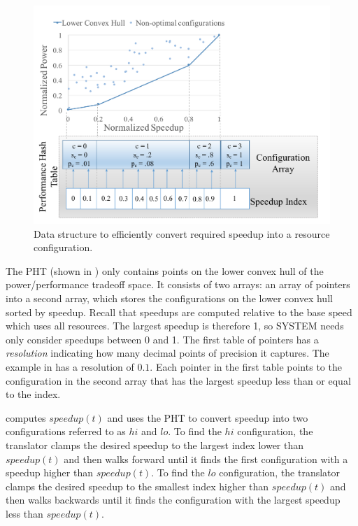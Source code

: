 \begin{figure}
\includegraphics[width=\columnwidth]{figures/performance-hash-table.pdf}
\caption{Data structure to efficiently convert required speedup into a
  resource configuration.}
  \label{fig:pht}
\end{figure}

The PHT (shown in ) only contains points on the lower
convex hull of the power/performance tradeoff space.  It consists of
two arrays: an array of pointers into a second array, which stores the
configurations on the lower convex hull sorted by speedup.  Recall
that speedups are computed relative to the base speed which uses all
resources.  The largest speedup is therefore 1, so SYSTEM{} needs only
consider speedups between 0 and 1.  The first table of pointers has a
\emph{resolution} indicating how many decimal points of precision it
captures.  The example in  has a resolution of $0.1$.
Each pointer in the first table points to the configuration in the
second array that has the largest speedup less than or equal to the
index.

\SYSTEM{} computes $speedup(t)$ and uses the PHT to convert speedup
into two configurations referred to as $hi$ and $lo$.  To find the
$hi$ configuration, the translator clamps the desired speedup to the
largest index lower than $speedup(t)$ and then walks forward until it
finds the first configuration with a speedup higher than $speedup(t)$.
To find the $lo$ configuration, the translator clamps the desired
speedup to the smallest index higher than $speedup(t)$ and then walks
backwards until it finds the configuration with the largest speedup
less than $speedup(t)$.

